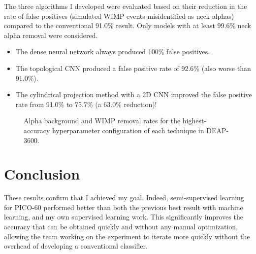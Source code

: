 \documentclass[12pt]{article}
\begin{document}
The three algorithms I developed were evaluated based on their reduction in the rate of false positives (simulated WIMP events misidentified as neck alphas) compared to the conventional 91.0\% result. Only models with at least 99.6\% neck alpha removal were considered.

\begin{itemize}
    \item The dense neural network always produced 100\% false positives.
    \item The topological CNN produced a false positive rate of 92.6\% (also worse than 91.0\%).
    \item The cylindrical projection method with a 2D CNN improved the false positive rate from 91.0\% to 75.7\% (a 63.0\% reduction)!
\end{itemize}

\begin{figure}[ht]
    \centering
    \caption{Alpha background and WIMP removal rates for the highest-accuracy hyperparameter configuration of each technique in DEAP-3600.}
\end{figure}

\section{Conclusion}

These results confirm that I achieved my goal. Indeed, semi-supervised learning for PICO-60 performed better than both the previous best result with machine learning, and my own supervised learning work. This significantly improves the accuracy that can be obtained quickly and without any manual optimization, allowing the team working on the experiment to iterate more quickly without the overhead of developing a conventional classifier.
\end{document}
